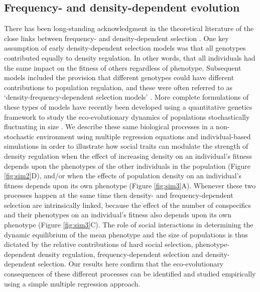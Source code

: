\documentclass{article}
\begin{document}
\subsection{Frequency- and density-dependent evolution}
There has been long-standing acknowledgment in the theoretical literature of the close links between frequency- and density-dependent selection \citep{Joshi2001}. One key assumption of early density-dependent selection models was that all genotypes contributed equally to density regulation. In other words, that all individuals had the same impact on the fitness of others regardless of phenotype. Subsequent models included the provision that different genotypes could have different contributions to population regulation, and these were often referred to as `density-frequency-dependent selection models' \citep{Anderson1971, Matessi1976, Asmussen1983}. More complete formulations of these types of models have recently been developed using a quantitative genetics framework to study the eco-evolutionary dynamics of populations stochastically fluctuating in size \citep{Lande2007, Engen2020}. We describe these same biological processes in a non-stochastic environment using multiple regression equations and individual-based simulations in order to illustrate how social traits can modulate the strength of density regulation when the effect of increasing density on an individual's fitness depends upon the phenotypes of the other individuals in the population (Figure \ref{fig:sim2}D), and/or when the effects of population density on an individual's fitness depends upon its own phenotype (Figure \ref{fig:sim3}A). Whenever these two processes happen at the same time then density- and frequency-dependent selection are intrinsically linked, because the effect of the number of conspecifics and their phenotypes on an individual's fitness also depends upon its own phenotype (Figure \ref{fig:sim3}C). The role of social interactions in determining the dynamic equilibrium of the mean phenotype and the size of populations is thus dictated by the relative contributions of hard social selection, phenotype-dependent density regulation, frequency-dependent selection and density-dependent selection. Our results here confirm that the eco-evolutionary consequences of these different processes can be identified and studied empirically using a simple multiple regression approach. 
\end{document}
